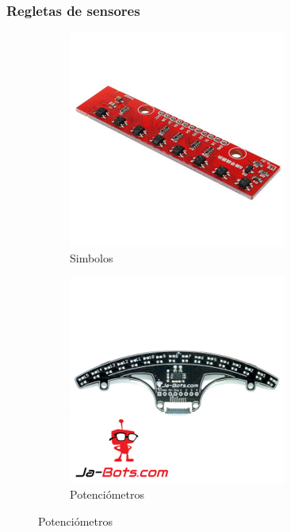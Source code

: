 \documentclass[a4paper,11pt]{report}    %
\begin{document}
\subsubsection{Regletas de sensores}


\begin{figure}[H]
    \begin{subfigure}[t]{0.475\textwidth}
        \includegraphics[width=\textwidth]{img/14.png}
        \caption{Simbolos}
        \label{subfig:example-image-b}
    \end{subfigure}%
    \hfill
    \begin{subfigure}[t]{0.475\textwidth}
        \includegraphics[width=\textwidth]{img/15.png}
        \caption{Potenciómetros}
        \label{subfig:example-image-c}
    \end{subfigure}


\end{figure}
\end{document}
